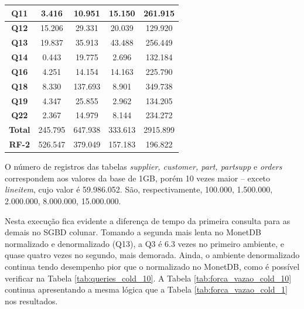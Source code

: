\begin{table}[htpb]
\begin{tabular}{|c|c|c|c|c|}
        \textbf{Q11}   & 3.416                 & 10.951                   & 15.150              & 261.915               \\ \hline
        \textbf{Q12}   & 15.206                & 29.331                   & 20.039              & 129.920               \\ \hline
        \textbf{Q13}   & 19.837                & 35.913                   & 43.488              & 256.449               \\ \hline
        \textbf{Q14}   & 0.443                 & 19.775                   & 2.696               & 132.184               \\ \hline
        \textbf{Q16}   & 4.251                 & 14.154                   & 14.163              & 225.790               \\ \hline
        \textbf{Q18}   & 8.330                 & 137.693                  & 8.901               & 349.738               \\ \hline
        \textbf{Q19}   & 4.347                 & 25.855                   & 2.962               & 134.205               \\ \hline
        \textbf{Q22}   & 2.367                 & 14.979                   & 8.144               & 234.272               \\ \hline
        \textbf{Total} & 245.795               & 647.938                  & 333.613             & 2915.899              \\ \hline
        \textbf{RF-2}  & 526.547               & 379.049                  & 157.183             & 196.822               \\ \hline

\end{tabular}
\end{table}

O número de registros das tabelas \textit{supplier, customer, part, partsupp} e \textit{orders} correspondem aos valores da base de 1GB, porém 10 vezes maior -- exceto \textit{lineitem}, cujo valor é 59.986.052. São, respectivamente, 100.000, 1.500.000, 2.000.000, 8.000.000, 15.000.000.

Nesta execução fica evidente a diferença de tempo da primeira consulta para as demais no SGBD colunar. Tomando a segunda mais lenta no MonetDB normalizado e denormalizado (Q13), a Q3 é 6.3 vezes no primeiro ambiente, e quase quatro vezes no segundo, mais demorada. Ainda, o ambiente denormalizado continua tendo desempenho pior que o normalizado no MonetDB, como é possível verificar na Tabela \ref{tab:queries_cold_10}. A Tabela \ref{tab:forca_vazao_cold_10} continua apresentando a mesma lógica que a Tabela \ref{tab:forca_vazao_cold_1} nos resultados.

